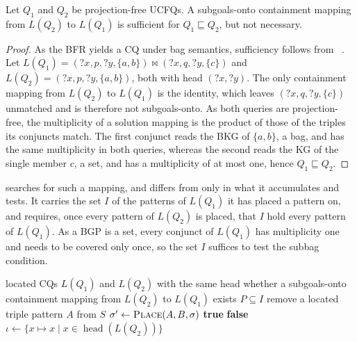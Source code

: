\begin{proposition}\label{prop_bkg_sufficient}
Let $Q_1$ and $Q_2$ be projection-free \acp{UCFQ}.
A subgoals-onto containment mapping from $L(Q_2)$ to $L(Q_1)$ is sufficient for $Q_1 \sqsubseteq Q_2$, but not necessary.
\end{proposition}

\begin{proof}
As the \ac{BFR} yields a \ac{CQ} under bag semantics, sufficiency follows from \citeauthor{Afrati2010}~\cite[Theorem~2]{Afrati2010}.
Let $L(Q_1) = (?x, p, ?y, \{a, b\}) \bowtie (?x, q, ?y, \{c\})$ and $L(Q_2) = (?x, p, ?y, \{a, b\})$, both with head $(?x, ?y)$.
The only containment mapping from $L(Q_2)$ to $L(Q_1)$ is the identity, which leaves $(?x, q, ?y, \{c\})$ unmatched and is therefore not subgoals-onto.
As both queries are projection-free, the multiplicity of a solution mapping is the product of those of the triples its conjuncts match.
The first conjunct reads the \ac{BKG} of $\{a, b\}$, a bag, and has the same multiplicity in both queries, whereas the second reads the \ac{KG} of the single member $c$, a set, and has a multiplicity of at most one, hence $Q_1 \sqsubseteq Q_2$.
\end{proof}

 searches for such a mapping, and differs from  only in what it accumulates and tests.
It carries the set $I$ of the patterns of $L(Q_1)$ it has placed a pattern on, and requires, once every pattern of $L(Q_2)$ is placed, that $I$ hold every pattern of $L(Q_1)$.
As a \ac{BGP} is a set, every conjunct of $L(Q_1)$ has multiplicity one and needs to be covered only once, so the set $I$ suffices to test the subbag condition.

\begin{algorithm}
  \caption{Search for a subgoals-onto containment mapping}
  \label{alg_subgoals_onto}
  \begin{algorithmic}[1]
    \Require located \acp{CQ} $L(Q_1)$ and $L(Q_2)$ with the same head
    \Ensure whether a subgoals-onto containment mapping from $L(Q_2)$ to $L(Q_1)$ exists
        \State \Return $P \subseteq I$
      \EndIf
      \State remove a located triple pattern $A$ from $S$
        \State $\sigma' \gets \Call{Place}{A, B, \sigma}$
          \State \Return \textbf{true}
        \EndIf
      \EndFor
      \State \Return \textbf{false}
    \EndFunction
      \State $\iota \gets \{x \mapsto x \mid x \in \operatorname{head}(L(Q_2))\}$
      \State \Return {}
    \EndFunction
  \end{algorithmic}
\end{algorithm}


